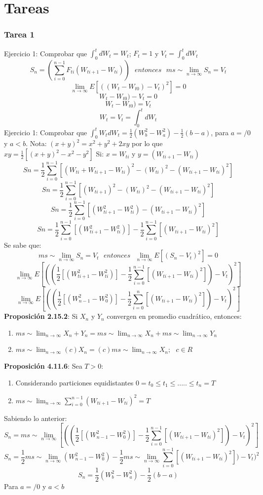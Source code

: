 \documentclass[11pt,fleqn]{book} %
\numberwithin{equation}{section} %
\numberwithin{figure}{section} %
\numberwithin{table}{section} %
\begin{document}
\section{Tareas}
\subsubsection{Tarea 1}
Ejercicio 1: Comprobar que $\int_{0}^{t} dW_{t} = W_{t}$; $F_{t} = 1$ y $V_{t} = \int_{0}^{t} dW_{t}$
$$S_{n} = (\sum_{i=0}^{n-1}F_{ti}(W_{ti+1}-W_{ti})) \:\:\: entonces \:\:\: ms\sim \lim_{n \to \infty} S_{n} = V_{t}  $$ 
$$ \lim_{n \to \infty} E[((W_{t}-W_{t0}) - V_{t})^2] = 0$$
$$ W_{t}-W_{t0}) - V_{t} = 0 $$
$$ W_{t}-W_{t0}) = V_{t}  $$
$$ W_{t} = V_{t} = \int_{0}^{t} dW_{t} $$
Ejercicio 1: Comprobar que $\int_{0}^{t} W_{t} dW_{t} = \frac{1}{2} (W_{b}^{2} - W_{a}^{2} ) - \frac{1}{2} (b-a)$, para $a =/0$ y $a<b$.
Nota: $(x + y)^2 = x^2 + y^2 + 2xy $ por lo que $ xy = \frac{1}{2}[(x+y)^2 - x^2 - y^2 ]$
Si: $x = W_{ti}$ y $ y = (W_{ti + 1} - W_{ti})$
$$Sn = \frac{1}{2}\sum_{i=0}^{n-1}[(W_{ti} + W_{ti + 1} - W_{ti})^2 - (W_{ti})^2 - (W_{ti + 1} - W_{ti})^2 ]$$
$$Sn = \frac{1}{2}\sum_{i=0}^{n-1}[(W_{ti + 1})^2 - (W_{ti})^2 - (W_{ti + 1} - W_{ti})^2 ]$$
$$Sn = \frac{1}{2}\sum_{i=0}^{n-1}[(W_{ti + 1}^2 - W_{ti}^2) - (W_{ti + 1} - W_{ti})^2 ]$$
$$Sn = \frac{1}{2}\sum_{i=0}^{n-1}[(W_{ti + 1}^2 - W_{ti}^2)] - \frac{1}{2}\sum_{i=0}^{n-1}[(W_{ti + 1} - W_{ti})^2 ]$$
Se sabe que: 
$$ms\sim \lim_{n \to \infty} S_{n} = V_{t} \:\:\: entonces \:\:\: \lim_{n \to \infty} E[(S_{n} - V_{t})^2] = 0 $$
$$\lim_{n \to \infty} E[((\frac{1}{2}[(W_{ti + 1}^2 - W_{ti}^2)] - \frac{1}{2}\sum_{i=0}^{n-1}[(W_{ti + 1} - W_{ti})^2 ]) - V_{t})^2]$$
$$\lim_{n \to \infty} E[((\frac{1}{2}[(W_{n-1}^2 - W_{0}^2)] - \frac{1}{2}\sum_{i=0}^{n}[(W_{ti + 1} - W_{ti})^2 ]) - V_{t})^2]$$
\textbf{Proposición 2.15.2}: Si $X_{n}$ y $Y_{n}$ convergen en promedio cuadrático, entonces:
\begin{enumerate}
\item $ ms\sim \lim_{n \to \infty} X_{n} + Y_{n} = ms\sim \lim_{n \to \infty} X_{n} + ms\sim \lim_{n \to \infty} Y_{n}$
\item $ ms\sim \lim_{n \to \infty} (c)X_{n} = (c) ms\sim \lim_{n \to \infty} X_{n}; \:\:\: c \in R$
\end{enumerate}
\textbf{Proposición 4.11.6}: Sea $T>0$:
\begin{enumerate}
\item Considerando particiones equidistantes $0=t_{0}\leq t_{1}\leq ..... \leq t_{n} = T$
\item $ ms\sim \lim_{n \to \infty} \sum_{i=0}^{n-1}(W_{ti+1}-W_{ti})^2= T$
\end{enumerate}
Sabiendo lo anterior:
$$S_{n} = ms\sim \lim_{n \to \infty} [((\frac{1}{2}[(W_{n-1}^2 - W_{0}^2)] - \frac{1}{2}\sum_{i=0}^{n-1}[(W_{ti + 1} - W_{ti})^2 ]) - V_{t})^2]$$
$$ S_{n} = \frac{1}{2} ms\sim \lim_{n \to \infty} (W_{n-1}^2 - W_{0}^2) - \frac{1}{2} ms\sim \lim_{n \to \infty} \sum_{i=0}^{n-1}[(W_{ti + 1} - W_{ti})^2 ]) - V_{t})^2 $$
$$S_{n} = \frac{1}{2} (W_{b}^{2} - W_{a}^{2} ) - \frac{1}{2} (b-a)$$
Para $a =/0$ y $a<b$
\end{document}
